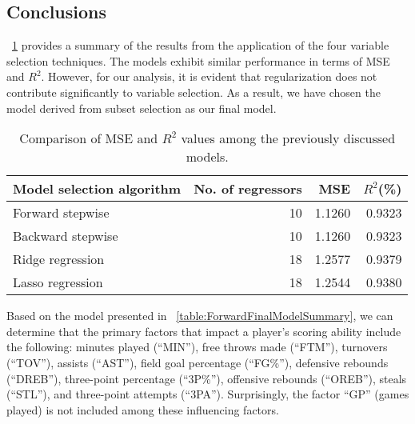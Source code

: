 \subsection{Conclusions}

\Tab~\ref{table:RegEvalParams} provides a summary of the results from the application of the four variable selection techniques.
The models exhibit similar performance in terms of MSE and $R^2$. 
However, for our analysis, it is evident that regularization does not contribute significantly to variable selection. 
As a result, we have chosen the model derived from subset selection as our final model.

\begin{table}[H]
	\centering
	\begin{tabular}{|| l | r | r | r ||} 
		\hline
		Model selection algorithm & No. of regressors & MSE & $R^2$(\%) \\
		\hline
		Forward stepwise & 10 & 1.1260 & 0.9323 \\
		\hline
		Backward stepwise & 10 & 1.1260 & 0.9323 \\
		\hline
		Ridge regression & 18 & 1.2577 & 0.9379 \\
		\hline
		Lasso regression & 18 & 1.2544 & 0.9380 \\
		\hline
	\end{tabular}
	\caption{Comparison of MSE and $R^2$ values among the previously discussed models.}
	\label{table:RegEvalParams}
\end{table}

Based on the model presented in \Tab~\ref{table:ForwardFinalModelSummary}, we can determine that the primary factors that impact a player's scoring ability include the following: minutes played (``MIN''), free throws made (``FTM''), turnovers (``TOV''), assists (``AST''), field goal percentage (``FG\%''), defensive rebounds (``DREB''), three-point percentage (``3P\%''), offensive rebounds (``OREB''), steals (``STL''), and three-point attempts (``3PA'').
Surprisingly, the factor ``GP'' (games played) is not included among these influencing factors.
